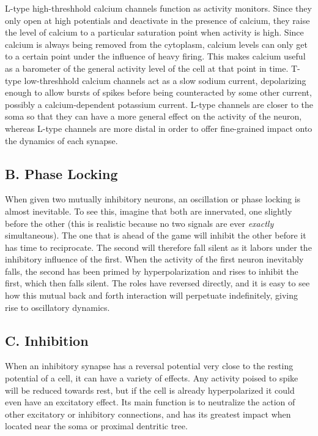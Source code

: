 \documentclass[12pt]{article}
\begin{document}
L-type high-threshhold calcium channels function as activity monitors.  Since they only open at high potentials and deactivate in the presence of calcium, they raise the level of calcium to a particular saturation point when activity is high.  Since calcium is always being removed from the cytoplasm, calcium levels can only get to a certain point under the influence of heavy firing.  This makes calcium useful as a barometer of the general activity level of the cell at that point in time.  T-type low-threshhold calcium channels act as a slow sodium current, depolarizing enough to allow bursts of spikes before being counteracted by some other current, possibly a calcium-dependent potassium current.  L-type channels are closer to the soma so that they can have a more general effect on the activity of the neuron, whereas L-type channels are more distal in order to offer fine-grained impact onto the dynamics of each synapse.  

\subsection{B. Phase Locking}

When given two mutually inhibitory neurons, an oscillation or phase locking is almost inevitable.  To see this, imagine that both are innervated, one slightly before the other (this is realistic because no two signals are ever {\em exactly} simultaneous).  The one that is ahead of the game will inhibit the other before it has time to reciprocate.  The second will therefore fall silent as it labors under the inhibitory influence of the first.  When the activity of the first neuron inevitably falls, the second has been primed by hyperpolarization and rises to inhibit the first, which then falls silent.  The roles have reversed directly, and it is easy to see how this mutual back and forth interaction will perpetuate indefinitely, giving rise to oscillatory dynamics.

\subsection{C. Inhibition}

When an inhibitory synapse has a reversal potential very close to the resting potential of a cell, it can have a variety of effects.  Any activity poised to spike will be reduced towards rest, but if the cell is already hyperpolarized it could even have an excitatory effect.  Its main function is to neutralize the action of other excitatory or inhibitory connections, and has its greatest impact when located near the soma or proximal dentritic tree. 
\end{document}
